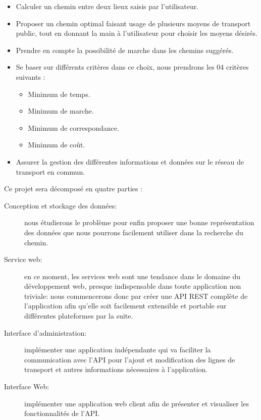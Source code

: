 \begin{itemize}
	\item Calculer un chemin entre deux lieux saisis par l'utilisateur.
	\item Proposer un chemin optimal faisant usage de plusieurs moyens de transport public, tout en donnant la main à l'utilisateur pour choisir les moyens désirés.
	\item Prendre en compte la possibilité de marche dans les chemins suggérés.
	\item Se baser sur différents critères dans ce choix, nous prendrons les 04 critères suivants : 
	\begin{itemize}
		\item Minimum de temps.
		\item Minimum de marche.
		\item Minimum de correspondance.
		\item Minimum de coût.
	\end{itemize}	 
	\item Assurer la gestion des différentes informations et données sur le réseau de transport en commun.\\
\end{itemize}
Ce projet sera décomposé en quatre parties :
\begin{description}
	\item[Conception et stockage des données:] nous étudierons le problème pour enfin proposer une bonne représentation des données que nous pourrons facilement utiliser dans la recherche du chemin.

	\item[Service web:] en ce moment, les services web sont une tendance dans le domaine du développement web, presque indispensable dans toute application non triviale: nous commencerons donc par créer une \Gls{API} REST complète de l'application afin qu'elle soit facilement extensible et portable sur différentes \glspl{plateforme} par la suite.
	
	\item[Interface d'administration:] implémenter une application indépendante qui va faciliter la  communication avec l'API pour l'ajout et modification des lignes de transport et autres informations nécessaires à l'application.
	
	
	\item[Interface Web:] implémenter une application web client afin de présenter et visualiser les fonctionnalités de l'API.
\end{description}


